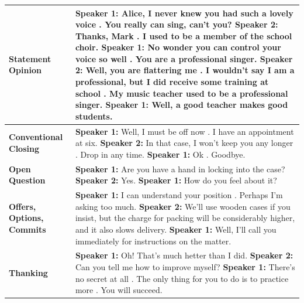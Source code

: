 \documentclass[11pt]{article}
\begin{document}
\begin{table}[ht!]
\begin{tabular}{|p{3cm}|p{11.5cm}|}
     \textbf{Statement Opinion}    & \textbf{Speaker 1:} Alice, I never knew you had such a lovely voice . You really can sing, can't you?\newline 
\hspace*{0.5cm} \textbf{Speaker 2:} Thanks, Mark . I used to be a member of the school choir.\newline 
\textbf{Speaker 1:} No wonder you can control your voice so well . You are a professional singer.\newline 
\hspace*{0.5cm} \textbf{Speaker 2:} Well, you are flattering me . I wouldn't say I am a professional, but I did receive some training at school . My music teacher used to be a professional singer.\newline 
\textbf{Speaker 1:} Well, a good teacher makes good students.\\\hline
     \textbf{Conventional Closing}    & \textbf{Speaker 1:} Well, I must be off now . I have an appointment at six.\newline 
\hspace*{0.5cm} \textbf{Speaker 2:} In that case, I won't keep you any longer . Drop in any time.\newline 
\textbf{Speaker 1:} Ok . Goodbye. \\\hline
     \textbf{Open Question}   & \textbf{Speaker 1:} Are you have a hand in locking into the case?\newline 
\hspace*{0.5cm} \textbf{Speaker 2:} Yes.\newline 
\textbf{Speaker 1:} How do you feel about it? \\\hline
     \textbf{Offers, Options, Commits}    & \textbf{Speaker 1:} I can understand your position . Perhaps I'm asking too much.\newline 
\hspace*{0.5cm} \textbf{Speaker 2:} We'll use wooden cases if you insist, but the charge for packing will be considerably higher, and it also slows delivery.\newline 
\textbf{Speaker 1:} Well, I'll call you immediately for instructions on the matter. \\\hline
     \textbf{Thanking}    & \textbf{Speaker 1:} Oh! That's much hetter than I did.\newline 
    \hspace*{0.5cm} \textbf{Speaker 2:} Can you tell me how to improve myself?\newline 
\textbf{Speaker 1:} There's no secret at all . The only thing for you to do is to practice more . You will succeed.\newline 

\end{tabular}
\end{table}
\end{document}
